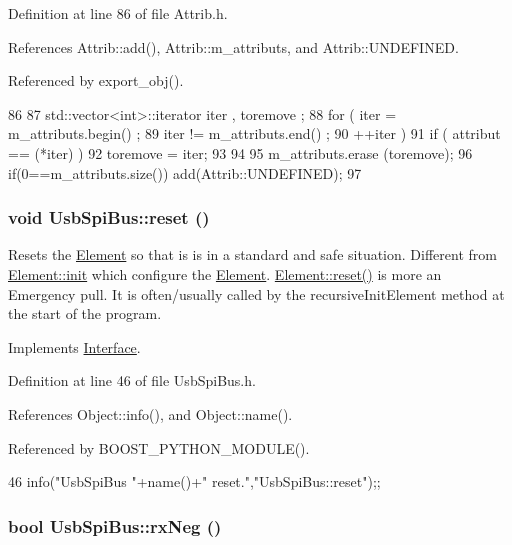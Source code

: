 Definition at line 86 of file Attrib.h.

References Attrib::add(), Attrib::m\_\-attributs, and Attrib::UNDEFINED.

Referenced by export\_\-obj().


\begin{DoxyCode}
86                                {
87     std::vector<int>::iterator iter , toremove ;
88     for ( iter  = m_attributs.begin() ;
89           iter != m_attributs.end()   ;
90           ++iter ) {
91       if ( attribut == (*iter) ) {
92         toremove = iter;
93       }
94     }
95     m_attributs.erase (toremove);
96     if(0==m_attributs.size()) add(Attrib::UNDEFINED);
97   }
\end{DoxyCode}
\hypertarget{classUsbSpiBus_aa795a27f7429f0c0285056964659d433}{
\subsubsection[{reset}]{\setlength{\rightskip}{0pt plus 5cm}void UsbSpiBus::reset ()}}
\label{classUsbSpiBus_aa795a27f7429f0c0285056964659d433}
Resets the \hyperlink{classElement}{Element} so that is is in a standard and safe situation. Different from \hyperlink{classElement_af42754b5cabc198869222725218d695c}{Element::init} which configure the \hyperlink{classElement}{Element}. \hyperlink{classElement_a69efffa22f06909d768149715565cb56}{Element::reset()} is more an Emergency pull. It is often/usually called by the recursiveInitElement method at the start of the program. 

Implements \hyperlink{classInterface_a4d44329cea9981a9e0392eaaf99efadd}{Interface}.

Definition at line 46 of file UsbSpiBus.h.

References Object::info(), and Object::name().

Referenced by BOOST\_\-PYTHON\_\-MODULE().


\begin{DoxyCode}
46 { info("UsbSpiBus "+name()+" reset.","UsbSpiBus::reset");};
\end{DoxyCode}
\hypertarget{classUsbSpiBus_ab24f6e85697305b26997b8dec3f18254}{
\subsubsection[{rxNeg}]{\setlength{\rightskip}{0pt plus 5cm}bool UsbSpiBus::rxNeg ()}}
\label{classUsbSpiBus_ab24f6e85697305b26997b8dec3f18254}



